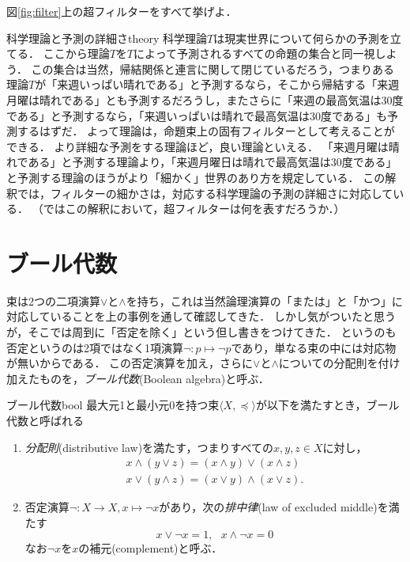 \documentclass[11pt,a4paper, dvipdfmx]{jsarticle}
\begin{document}
\begin{renshu}{}{}
    図\ref{fig:filter}上の超フィルターをすべて挙げよ．
\end{renshu}

\begin{rei}{科学理論と予測の詳細さ}{theory}
科学理論$T$は現実世界について何らかの予測を立てる．
ここから理論$T$を$T$によって予測されるすべての命題の集合と同一視しよう．
この集合は当然，帰結関係と連言に関して閉じているだろう，つまりある理論$T$が「来週いっぱい晴れである」と予測するなら，そこから帰結する「来週月曜は晴れである」とも予測するだろうし，またさらに「来週の最高気温は30度である」と予測するなら，「来週いっぱいは晴れで最高気温は30度である」も予測するはずだ．
よって理論は，命題束上の固有フィルターとして考えることができる．
より詳細な予測をする理論ほど，良い理論といえる．
「来週月曜は晴れである」と予測する理論より，「来週月曜日は晴れで最高気温は30度である」と予測する理論のほうがより「細かく」世界のあり方を規定している．
この解釈では，フィルターの細かさは，対応する科学理論の予測の詳細さに対応している．
（ではこの解釈において，超フィルターは何を表すだろうか．）
\end{rei}



\section{ブール代数}

束は2つの二項演算$\vee$と$\wedge$を持ち，これは当然論理演算の「または」と「かつ」に対応していることを上の事例を通して確認してきた．
しかし気がついたと思うが，そこでは周到に「否定を除く」という但し書きをつけてきた．
というのも否定というのは2項ではなく1項演算$\neg:p \mapsto \neg p$であり，単なる束の中には対応物が無いからである．
この否定演算を加え，さらに$\vee$と$\wedge$についての分配則を付け加えたものを，\emph{ブール代数}(Boolean algebra)と呼ぶ．

\begin{dfn}{ブール代数}{bool}
    最大元1と最小元0を持つ束$\langle X, \preceq \rangle$が以下を満たすとき，ブール代数と呼ばれる
    \begin{enumerate}
        \item \emph{分配則}(distributive law)を満たす，つまりすべての$x, y, z \in X$に対し，
        \begin{align}
         x \wedge (y \vee z) = (x \wedge y) \vee (x \wedge z) \label{eqn:dist1}\\
         x \vee (y \wedge z) = (x \vee y) \wedge (x \vee z) . \label{eqn:dist2}
        \end{align}
        \item 否定演算$\neg: X \to X, x \mapsto \neg x$があり，次の\emph{排中律}(law of excluded middle)を満たす
        \begin{equation}
            x \vee \neg x = 1, \ \ \ x \wedge \neg x = 0
           \label{eqn:excluded_middle}
        \end{equation}
        なお$\neg x$を$x$の補元(complement)と呼ぶ．
    \end{enumerate}   
\end{dfn}
\end{document}
